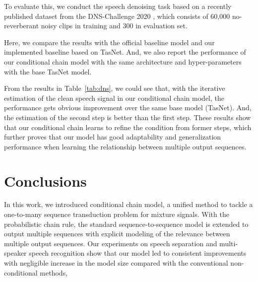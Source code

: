 \documentclass{article}
\begin{document}
To evaluate this, we conduct the speech denoising task based on a recently published dataset from the DNS-Challenge 2020 \cite{DNSChallenge2020}, which consists of 60,000 no-reverberant noisy clips in training and 300 in evaluation set. 
\begin{table}[h]
\centering
\caption{The SDR performance on no-reverberant testset in DNS-challenge 2020. }
\label{tab:dns}
\end{table}

Here, we compare the results with the official baseline model \cite{xia2020weighted} and our implemented baseline based on TasNet. And, we also report the performance of our conditional chain model with the same architecture and hyper-parameters with the base TasNet model. 

From the results in Table~\ref{tab:dns}, we could see that, with the iterative estimation of the clean speech signal in our conditional chain model, the performance gets obvious improvement over the same base model (TasNet). And, the estimation of the second step is better than the first step. These results show that our conditional chain learns to refine the condition from former steps, which further proves that our model has good adaptability and generalization performance when learning the relationship between multiple output sequences.




\section{Conclusions}\label{sec:conclusion}
In this work, we introduced conditional chain model, a unified method to tackle a one-to-many sequence transduction problem for mixture signals.
With the probabilistic chain rule, the standard sequence-to-sequence model is extended to output multiple sequences with explicit modeling of the relevance between multiple output sequences.
Our experiments on speech separation and multi-speaker speech recognition show that our model led to consistent improvements with negligible increase in the model size compared with the conventional non-conditional methods, 
\end{document}
